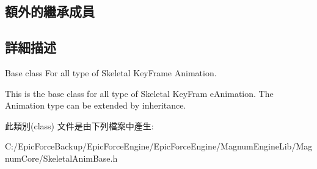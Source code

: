 \subsection*{額外的繼承成員}


\subsection{詳細描述}
Base class For all type of Skeletal Key\+Frame Animation. 

This is the base class for all type of Skeletal Key\+Fram e\+Animation. The Animation type can be extended by inheritance. 

此類別(class) 文件是由下列檔案中產生\+:\begin{DoxyCompactItemize}
\item 
C\+:/\+Epic\+Force\+Backup/\+Epic\+Force\+Engine/\+Epic\+Force\+Engine/\+Magnum\+Engine\+Lib/\+Magnum\+Core/Skeletal\+Anim\+Base.\+h\end{DoxyCompactItemize}
